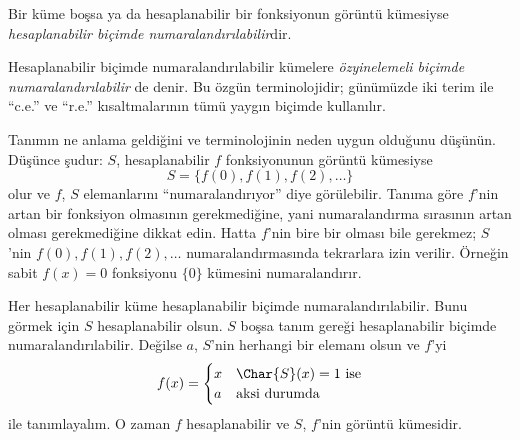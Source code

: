 \documentclass[../../../include/open-logic-section]{subfiles}
\begin{document}

\begin{defn}
Bir küme boşsa ya da hesaplanabilir bir fonksiyonun görüntü kümesiyse
\emph{hesaplanabilir biçimde numaralandırılabilir}dir.
\end{defn}

\begin{history}
Hesaplanabilir biçimde numaralandırılabilir kümelere \emph{özyinelemeli
biçimde numaralandırılabilir} de denir. Bu özgün terminolojidir; günümüzde
iki terim ile ``c.e.'' ve ``r.e.'' kısaltmalarının tümü yaygın biçimde
kullanılır.
\end{history}

\begin{explain}
Tanımın ne anlama geldiğini ve terminolojinin neden uygun olduğunu düşünün.
Düşünce şudur: $S$, hesaplanabilir $f$ fonksiyonunun görüntü kümesiyse
\[
  S=\{f(0),f(1),f(2),\dots\}
\]
olur ve $f$, $S$ elemanlarını ``numaralandırıyor'' diye görülebilir. Tanıma
göre $f$'nin artan bir fonksiyon olmasının gerekmediğine, yani numaralandırma
sırasının artan olması gerekmediğine dikkat edin. Hatta $f$'nin bire bir
olması bile gerekmez; $S$'nin $f(0),f(1),f(2),\dots$ numaralandırmasında
tekrarlara izin verilir. Örneğin sabit $f(x)=0$ fonksiyonu $\{0\}$ kümesini
numaralandırır.
\end{explain}

Her hesaplanabilir küme hesaplanabilir biçimde numaralandırılabilir. Bunu
görmek için $S$ hesaplanabilir olsun. $S$ boşsa tanım gereği hesaplanabilir
biçimde numaralandırılabilir. Değilse $a$, $S$'nin herhangi bir elemanı olsun
ve $f$'yi
\[
  f(x)=\begin{cases}
    x & \text{$\Char{S}(x)=1$ ise}\\
    a & \text{aksi durumda}
  \end{cases}
\]
ile tanımlayalım. O zaman $f$ hesaplanabilir ve $S$, $f$'nin görüntü
kümesidir.
\end{document}

